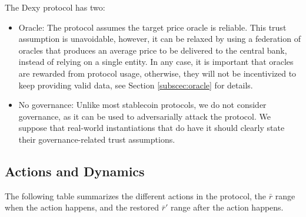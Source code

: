 \documentclass{ifcolog}
\newcommand{\rr}{\bar{r}}
\newcommand{\dx}{Dexy}
\begin{document}
The \dx{} protocol has two:

\begin{itemize}
  \item{Oracle:} The protocol assumes the target price oracle is reliable. This trust assumption is unavoidable, however, 
  it can be relaxed by using a federation of oracles that produces an average price to be delivered to the central bank, 
  instead of relying on a single entity. In any case, it is important that oracles are rewarded from protocol usage, 
  otherwise, they will not be incentivized to keep providing valid data, see Section \ref{subscec:oracle} for details.

  \item{No governance:} Unlike most stablecoin protocols, we do not consider governance, as it can be used to 
  adversarially attack the protocol. We suppose that real-world instantiations that do have it should clearly state their 
  governance-related trust assumptions.
\end{itemize}

\subsection{Actions and Dynamics}
\label{subsec:actions}

The following table summarizes the different actions in the protocol, the $\rr$ range when the action happens, and the restored $\rr'$ range after the action happens.
\end{document}
